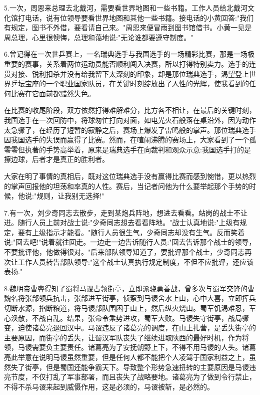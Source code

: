 \documentclass[UTF8]{ctexart}
\begin{document}
5.一次，周恩来总理去北戴河，需要看世界地图和一些书籍。工作人员给北戴河文化馆打电话，说有位领导要看世界地图和其他一些书籍。接电话的小黄回答:"我们有规定，图书不外借，要看请自己来。"周恩来便冒雨到图书馆借书。小黄一见是周总理，心里很懊悔，总理和蔼地说:"无论谁都要遵守制度。"\par
6.曾记得在一次世乒赛上，一名瑞典选手与我国选手的一场精彩比赛，那是一场极重要的赛事，关系着两位运动员能否顺利闯入决赛，所以打得特别卖力。选手的连贯对接、锐利扣杀并没有给我留下太深刻的印象，却是那位瑞典选手，渴望登上世界乒坛宝座的一个职业国家队员，在关键时刻绽放出了人性的光辉，使我看到的任何比赛在它面前都黯然失色。\par
在比赛的收尾阶段，双方依然打得难解难分，比方各不相让，在最后的关键时刻，我国选手在一次回防中，将球匆忙打向对面，如电光火石般落在桌沿外，因为动作太急骤了，在经历了短暂的寂静之后，赛场上爆发了雷鸣般的掌声。那位瑞典选手因我国选手的失误而赢得了比赛。然而，在喧闹沸腾的赛场上，大家看到了一个孤零零但执著的手势高举着，原来是瑞典选手在向裁判和观众示意:我国选手打的是擦边球，后者才是真正的胜利者。\par
大家在明了事情的真相后，既对这位瑞典选手没有赢得比赛而感到惋惜，更以热烈的掌声回报他的坦荡和率真的人性。赛后，当记者问他为什么要举起那个手势的时候，他说:"规则，让我别无选择!"\par
7.有一次，刘少奇同志去散步，走到某炮兵阵地，想进去看看。站岗的战士不让进。随行人员上前对战士说:"少奇同志想去看看阵地。"战士认真地说:"上级有规定，要有上级指示才能看。"随行人员很生气，少奇同志却没有生气。反而笑着说:"回去吧!"说着就往回走。一边走一边告诉随行人员:"回去告诉那个战士的领导，不要批评他，他做得很对。"后来部队领导知道了，要批评那个战士，少奇同志再次让工作人员转告部队领导:"这个战士认真执行规定制度，不但不应批评，还应该表扬."\par
8.魏明帝曹睿得知了蜀将马谡占领街亭，立即派骁勇善战，曾多次与蜀军交锋的曹魏名将张郃领兵抗击，张郃进军街亭，侦察到马谡舍水上山，心中大喜，立即挥兵切断水源，掐断粮道，将马谡部队围困于山上，然后纵火烧山。蜀军饥渴难忍，军心涣散，不战自乱。结果，张命令乘势进攻，蜀军大败。马谡失守街亭，战局骤变，迫使诸葛亮退回汉中。马谡违反了诸葛亮的调度，在山上扎营，是丢失街亭的主要原因，而街亭的丢失，让蜀汉军队丧失了继续进取陕西的最好时机，作为将领，马谡需要负主要责任。诸葛亮为了安抚朝野上下，不得不用马谡的人头。诸葛亮此举意在说明马谡虽然重要，但是任何人都不能把个人凌驾于国家利益之上，虽然失了街亭，但是蜀国还能争霸天下。导致整个形势急速扭转的主要原因是马谡违亮节度，不仅打乱了军事部署，而且丧失了战略要地。诸葛亮为了做到令行禁止，不得不杀马谡来起到威慑作用，这是必须的，马谡被斩，是必然的。\par
\end{document}
